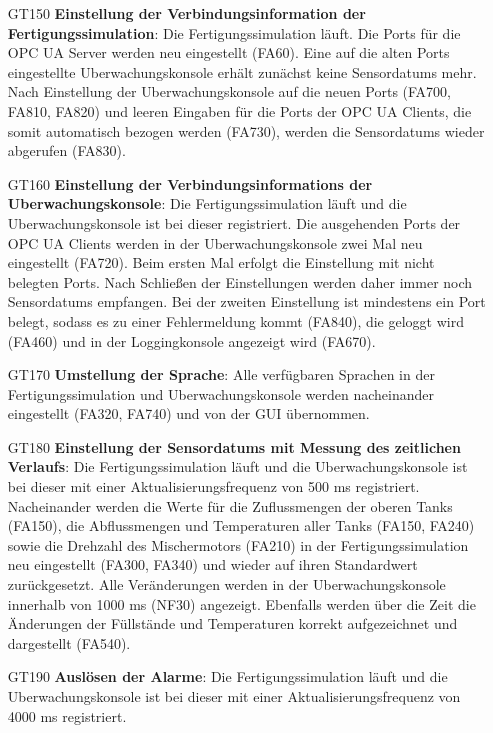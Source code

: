 \documentclass[parskip=full]{scrartcl}
\begin{document}
\begin{enumerate}
  \item[GT150] \textbf{Einstellung der \gls{Verbindungsinformation} der \gls{Fertigungssimulation}}: Die \gls{Fertigungssimulation} läuft. Die Ports für die \gls{OPC UA Server} werden neu eingestellt (FA60). Eine auf die
   alten Ports eingestellte \gls{Uberwachungskonsole} erhält zunächst keine \glspl{Sensordatum} mehr. Nach Einstellung der \gls{Uberwachungskonsole} auf die neuen Ports (FA700, FA810, FA820) und leeren Eingaben für die Ports der \glspl{OPC UA Client}, die somit automatisch bezogen werden (FA730), werden die \glspl{Sensordatum} wieder abgerufen (FA830).
  \item[GT160] \textbf{Einstellung der \glspl{Verbindungsinformation} der \gls{Uberwachungskonsole}}: Die \gls{Fertigungssimulation} läuft und die \gls{Uberwachungskonsole} ist bei dieser registriert. Die ausgehenden Ports der
   \glspl{OPC UA Client} werden in der \gls{Uberwachungskonsole} zwei Mal neu eingestellt (FA720). Beim ersten Mal erfolgt die Einstellung mit nicht belegten Ports. Nach Schließen der Einstellungen werden daher immer noch \glspl{Sensordatum} empfangen. Bei der zweiten Einstellung ist mindestens ein Port belegt, sodass es zu einer Fehlermeldung kommt (FA840), die geloggt wird (FA460) und in der Loggingkonsole angezeigt wird (FA670).
  \item[GT170] \textbf{Umstellung der Sprache}: Alle verfügbaren Sprachen in der \gls{Fertigungssimulation} und \gls{Uberwachungskonsole} werden nacheinander eingestellt (FA320, FA740) und von der \gls{GUI} übernommen.
  \item[GT180] \textbf{Einstellung der \glspl{Sensordatum} mit Messung des zeitlichen Verlaufs}: Die \gls{Fertigungssimulation} läuft und die \gls{Uberwachungskonsole} ist bei dieser mit einer
   Aktualisierungsfrequenz von 500 ms registriert. Nacheinander werden die Werte für die Zuflussmengen der oberen Tanks (FA150), die Abflussmengen und
   Temperaturen aller Tanks (FA150, FA240) sowie die Drehzahl des Mischermotors (FA210) in der \gls{Fertigungssimulation} neu eingestellt (FA300, FA340) und wieder auf ihren Standardwert zurückgesetzt.
   Alle Veränderungen werden in der \gls{Uberwachungskonsole} innerhalb von 1000 ms (NF30) angezeigt. Ebenfalls werden über die Zeit die Änderungen der Füllstände und
   Temperaturen korrekt aufgezeichnet und dargestellt (FA540).
  \item[GT190] \textbf{Auslösen der Alarme}: Die \gls{Fertigungssimulation} läuft und die \gls{Uberwachungskonsole} ist bei dieser mit einer Aktualisierungsfrequenz von 4000 ms registriert.

\end{enumerate}
\end{document}
